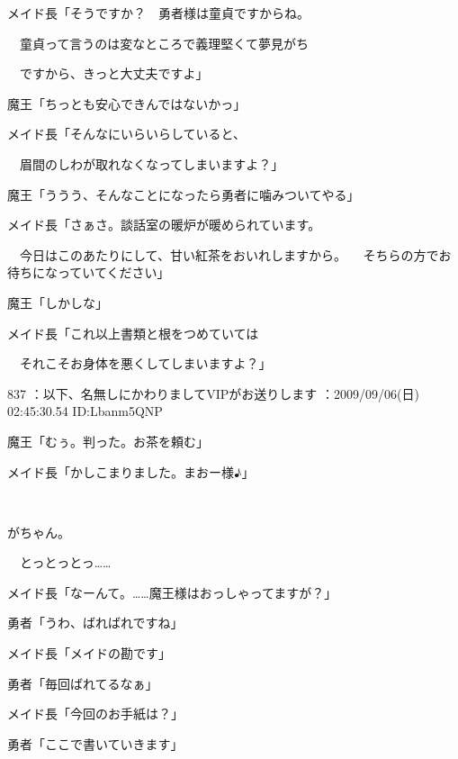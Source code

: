 \documentclass[a4j,twocolumn]{tarticle}
\begin{document}
メイド長「そうですか？　勇者様は童貞ですからね。\par{} 
　童貞って言うのは変なところで義理堅くて夢見がち\par{} 
　ですから、きっと大丈夫ですよ」 



魔王「ちっとも安心できんではないかっ」 



メイド長「そんなにいらいらしていると、\par{} 
　眉間のしわが取れなくなってしまいますよ？」 



魔王「ううう、そんなことになったら勇者に噛みついてやる」 



メイド長「さぁさ。談話室の暖炉が暖められています。\par{} 
　今日はこのあたりにして、甘い紅茶をおいれしますから。 
　そちらの方でお待ちになっていてください」 \par{}



魔王「しかしな」 



メイド長「これ以上書類と根をつめていては\par{} 
　それこそお身体を悪くしてしまいますよ？」

	
    
    

837 ：以下、名無しにかわりましてVIPがお送りします ：2009/09/06(日) 02:45:30.54 ID:Lbanm5QNP 


魔王「むぅ。判った。お茶を頼む」 



メイド長「かしこまりました。まおー様♪」 

　

がちゃん。\par{} 
　とっとっとっ…… 



メイド長「なーんて。……魔王様はおっしゃってますが？」\par{} 
勇者「うわ、ばればれですね」 



メイド長「メイドの勘です」\par{} 
勇者「毎回ばれてるなぁ」 



メイド長「今回のお手紙は？」\par{} 
勇者「ここで書いていきます」 
\end{document}
